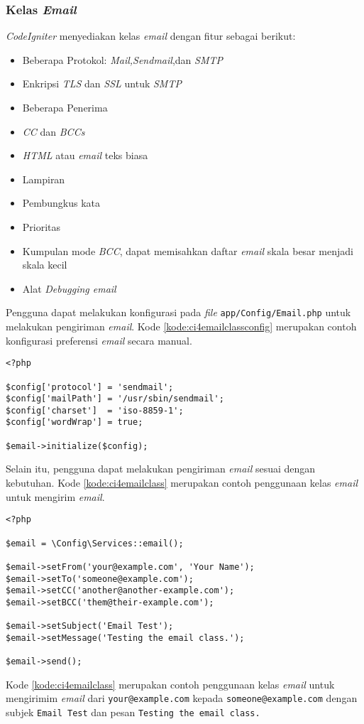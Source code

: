 \subsubsection{Kelas \textit{Email}}
\textit{CodeIgniter} menyediakan kelas \textit{email} dengan fitur sebagai berikut:
\begin{itemize}
\item Beberapa Protokol: \textit{Mail,Sendmail},dan \textit{SMTP}
\item Enkripsi \textit{TLS} dan \textit{SSL} untuk \textit{SMTP}
\item Beberapa Penerima
\item \textit{CC} dan \textit{BCCs}
\item \textit{HTML} atau \textit{email} teks biasa
\item Lampiran
\item Pembungkus kata
\item Prioritas
\item Kumpulan mode \textit{BCC}, dapat memisahkan daftar \textit{email} skala besar menjadi skala kecil
\item Alat \textit{Debugging email}
\end{itemize}

Pengguna dapat melakukan konfigurasi pada \textit{file} \verb|app/Config/Email.php| untuk melakukan pengiriman \textit{email}. Kode \ref{kode:ci4emailclassconfig} merupakan contoh konfigurasi preferensi \textit{email} secara manual.
 \begin{lstlisting}[caption=Contoh kode untuk melakukan konfigurasi \textit{email}. ,label=kode:ci4emailclassconfig]
<?php

$config['protocol'] = 'sendmail';
$config['mailPath'] = '/usr/sbin/sendmail';
$config['charset']  = 'iso-8859-1';
$config['wordWrap'] = true;

$email->initialize($config);
\end{lstlisting}

Selain itu, pengguna dapat melakukan pengiriman \textit{email} sesuai dengan kebutuhan. Kode \ref{kode:ci4emailclass} merupakan contoh penggunaan kelas \textit{email} untuk mengirim \textit{email}.
\begin{lstlisting}[caption=Contoh kode untuk melakukan pengiriman \textit{email}. ,label=kode:ci4emailclass]
<?php

$email = \Config\Services::email();

$email->setFrom('your@example.com', 'Your Name');
$email->setTo('someone@example.com');
$email->setCC('another@another-example.com');
$email->setBCC('them@their-example.com');

$email->setSubject('Email Test');
$email->setMessage('Testing the email class.');

$email->send();
\end{lstlisting}
Kode \ref{kode:ci4emailclass} merupakan contoh penggunaan kelas \textit{email} untuk mengirimim \textit{email} dari \texttt{your@example.com} kepada \texttt{someone@example.com} dengan subjek \texttt{Email Test} dan pesan \texttt{Testing the email class.}
